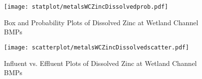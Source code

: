         \begin{figure}[hb]   %
            \centering
            \texttt{[image: statplot/metalsWCZincDissolvedprob.pdf]}
            \caption{Box and Probability Plots of Dissolved Zinc at Wetland Channel BMPs}
        \end{figure}         %
        
        
        \begin{figure}[hb]   %
            \centering
            \texttt{[image: scatterplot/metalsWCZincDissolvedscatter.pdf]}
            \caption{Influent vs. Effluent Plots of Dissolved Zinc at Wetland Channel BMPs}
        \end{figure}         %
        \clearpage
        